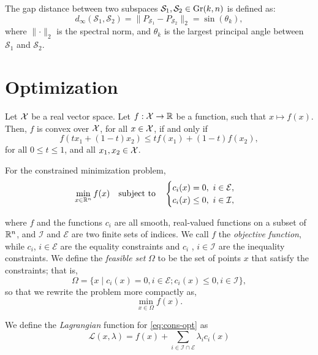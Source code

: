 \begin{definition}
    The gap distance between two subspaces $\mathcal{S}_1, \mathcal{S}_2 \in \text{Gr}(k,n)$ is defined as:
    \[
        d_{\infty}(\mathcal{S}_1, \mathcal{S}_2) = \lVert P_{\mathcal{S}_1} - P_{\mathcal{S}_2} \rVert_{2} = \sin(\theta_k),
    \]
    where $\lVert \cdot \rVert_{2}$ is the spectral norm, and $\theta_k$ is the largest principal angle between $\mathcal{S}_1$ and $\mathcal{S}_2$.
    
\end{definition}

\newpage
\section{Optimization}

\begin{definition}[Convexity]
    Let $\mathcal{X}$ be a real vector space. Let $f: \mathcal{X} \to \mathbb{R}$ be a function, such that $x \mapsto f(x)$. Then, $f$ is convex over $\mathcal{X}$, for all $x \in \mathcal{X}$, if and only if
    \[
        f(t x_1 + (1-t)x_2) \leq t f(x_1) + (1-t)f(x_2), 
    \]
    for all $0\leq t \leq 1$, and all $x_1, x_2 \in \mathcal{X}$.
\end{definition}
\begin{definition}
    For the constrained minimization problem,
    \begin{equation}\label{eq:cons-opt}
        \min_{x \in \mathbb{R}^n} f(x) \quad \textrm{subject to} \quad \begin{cases}
            c_i(x) = 0, \ i \in \mathcal{E}, \\
            c_i(x) \leq 0, \ i \in \mathcal{I},
        \end{cases}
    \end{equation}
\end{definition}
where $f$ and the functions $c_i$ are all smooth, real-valued functions on a subset of $\mathbb{R}^n$, and $\mathcal{I}$ and $\mathcal{E}$ are two finite sets of indices. We call $f$ the \textit{objective function}, while $c_i$, $i \in \mathcal{E}$ are the equality constraints and $c_i$ , $i \in \mathcal{I}$ are the inequality constraints. We define the \textit{feasible set} $\Omega$ to be the set of points $x$ that satisfy the constraints; that is,
\[
    \Omega = \{x \mid c_i(x) = 0, i \in \mathcal{E}; c_i(x) \leq 0, i \in \mathcal{I} \},
\]
so that we rewrite the problem more compactly as,
\[
    \min_{x \in \Omega} f(x).
\]
\begin{definition}
    We define the \textit{Lagrangian} function for \eqref{eq:cons-opt} as 
    \[
        \mathcal{L}(x, \lambda) = f(x) + \sum_{i \in \mathcal{I} \cap \mathcal{E}} \lambda_i c_i(x) 
    \]
\end{definition}
